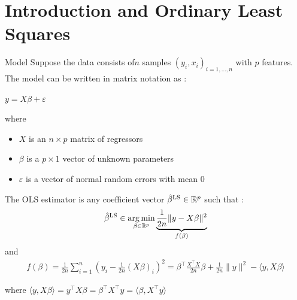 \documentclass[unknownkeysallowed]{beamer}
\begin{document}




\section{Introduction and Ordinary Least Squares}
\label{sec:introdcution}


\begin{frame}{Model}
Suppose the data consists of$n$ samples $(y_i, x_i)_{i=1,\dots,n}$ with $p$ features.
\newline The model can be written in matrix notation as :
\begin{center}
$y=X\beta+\varepsilon$
\end{center}
where
\begin{itemize}
	\item $X$ is an $n \times p$ matrix of regressors
	\item $\beta$ is a $p \times 1$ vector of unknown parameters
	\item $\varepsilon$ is a vector of normal random errors with mean $0$
\end{itemize}
\end{frame}


\begin{frame}
The OLS estimator is any coefficient vector
$\hat\beta^{\rm LS}\in\mathbb{R}^p$ such that :
\newline
\begin{align}
\hat\beta^{\rm LS} \in \operatorname*{arg\,min}_{\beta \in \mathbb{R}^p}
\underbrace{\frac{1}{2n}\|y-X\beta\|^2 }_{f(\beta)}
\end{align}
\vspace{0.5cm}
and
\begin{align*}
	f(\beta)
	= \frac{1}{2n}\sum_{i=1}^n (y_{i}-\frac{1}{2n}(X\beta)_{i})^2
	= \beta^{\top}\frac{X^{\top}X}{2n}\beta+\frac{1}{2n}\|y\|^2- \langle y,X\beta\rangle
\end{align*}

\vspace{0.5cm}
where
$\langle y,X\beta\rangle=y^{\top}X\beta=\beta^{\top}X^{\top}y=\langle \beta,X^{\top}y\rangle$
\end{frame}
\end{document}
